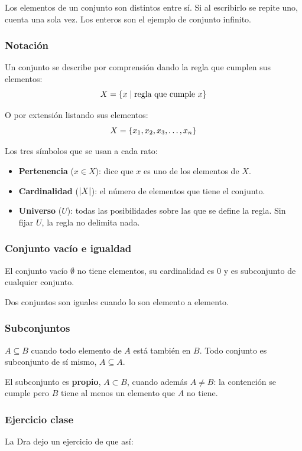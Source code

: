 \documentclass[11pt,letterpaper]{article}
\begin{document}
Los elementos de un conjunto son distintos entre sí. Si al escribirlo
se repite uno, cuenta una sola vez. Los enteros son el ejemplo de
conjunto infinito.

\subsubsection*{Notación}

Un conjunto se describe por comprensión dando la regla que cumplen sus
elementos:
\[
    X = \left\{ x \mid \text{regla que cumple } x \right\}
\]

O por extensión listando sus elementos:
\[
    X = \left\{ x_1, x_2, x_3, \ldots, x_n \right\}
\]

Los tres símbolos que se usan a cada rato:

\begin{itemize}[itemsep=0.1em]
    \item \textbf{Pertenencia} ($x \in X$): dice que $x$ es uno de los
          elementos de $X$.
    \item \textbf{Cardinalidad} ($\left\lvert X \right\rvert$): el número de elementos que
          tiene el conjunto.
    \item \textbf{Universo} ($U$): todas las posibilidades sobre las
          que se define la regla. Sin fijar $U$, la regla no delimita
          nada.
\end{itemize}

\subsubsection*{Conjunto vacío e igualdad}

El conjunto vacío $\emptyset$ no tiene elementos, su cardinalidad es
$0$ y es subconjunto de cualquier conjunto.

Dos conjuntos son iguales cuando lo son elemento a elemento.

\subsubsection*{Subconjuntos}

$A \subseteq B$ cuando todo elemento de $A$ está también en $B$. Todo
conjunto es subconjunto de sí mismo, $A \subseteq A$.

El subconjunto es \textbf{propio}, $A \subset B$, cuando además
$A \neq B$: la contención se cumple pero $B$ tiene al menos un elemento
que $A$ no tiene.

\subsubsection*{Ejercicio clase}
La Dra dejo un ejercicio de que así:
\end{document}

